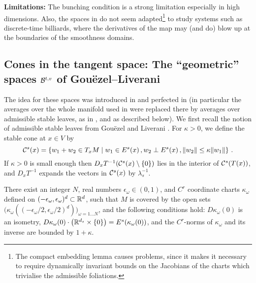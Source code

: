 \documentclass[10pt,twoside]{amsart}
\begin{document}
{\bf Limitations:}
The bunching condition is a strong limitation especially in high dimensions.
Also, the spaces in \cite{BG2, BLiv} do not seem 
adapted\footnote{The compact embedding lemma causes problems, since it makes it necessary to require
dynamically invariant bounds on
the Jacobians of the  charts which trivialise
the admissible foliations.} to study
systems such as discrete-time billiards, where the derivatives of the map may (and do) blow up at the boundaries
of the smoothness domains.



  

\subsection{Cones in the tangent space:  The ``geometric'' spaces $\mathcal{B}^{t,v}$ of Gou\"ezel--Liverani}
\label{tang}

The idea for these spaces was introduced in \cite{BKL} and perfected in
\cite{GL1, GL2} (in particular the averages over the whole manifold used
in \cite{BKL} were replaced  there by averages over admissible stable leaves, as in
\cite{Liv00}, and as described below).
We first recall the notion of admissible stable leaves from 
Gou\"ezel and Liverani \cite[\S 3]{GL1}.
For  $\kappa>0$, we define the stable
cone at $x\in V$ by
  \begin{equation*}
  \mathcal{C}^s(x)=\left\{ w_1+w_2 \in T_x M \mid w_1\in E^s(x)\, , w_2 \perp E^s(x)\, , \|w_2\|
  \leq \kappa \|w_1\| \right\} \, .
  \end{equation*}
If $\kappa>0$ is small enough then
$D_x T^{-1}(\mathcal{C}^s(x)\setminus \{0\})$ lies in
the interior of $\mathcal{C}^s(T (x))$, and $D_x T^{-1}$ expands the
vectors in $\mathcal{C}^s(x)$ by $\lambda_s^{-1}$.


\begin{definition}\label{notat0}
There exist an integer $N$, 
real numbers $\epsilon_\omega \in (0,1)$, and $C^{r}$ coordinate charts
 $\kappa_\omega$  defined on 
$(-\epsilon_\omega,\epsilon_\omega)^d\subset \mathbb{R}^d$, such
that $M$ is covered by the open sets
$\bigl(\kappa_\omega((-\epsilon_\omega/2,\epsilon_\omega/2)^d)\bigr)_{\omega=1\ldots N}$,
and the following conditions hold: $D\kappa_\omega(0)$ is an isometry,  $D\kappa_\omega(0)\cdot \bigl(\mathbb{R}^{d_s}\times\{0\}\bigr)= E^s(\kappa_\omega(0))$,
 and the $C^{r}$-norms of $\kappa_\omega$ and its inverse are bounded by
$1+\kappa$.
\end{definition}
\end{document}
